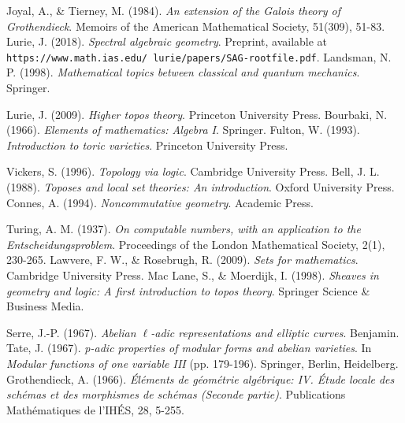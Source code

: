 \documentclass{article}
\begin{document}
\begin{thebibliography}{9}
 Joyal, A., \& Tierney, M. (1984). \textit{An extension of the Galois theory of Grothendieck}. Memoirs of the American Mathematical Society, 51(309), 51-83.
 Lurie, J. (2018). \textit{Spectral algebraic geometry}. Preprint, available at \texttt{https://www.math.ias.edu/~lurie/papers/SAG-rootfile.pdf}.
 Landsman, N. P. (1998). \textit{Mathematical topics between classical and quantum mechanics}. Springer.

 Lurie, J. (2009). \textit{Higher topos theory}. Princeton University Press.
 Bourbaki, N. (1966). \textit{Elements of mathematics: Algebra I}. Springer.
 Fulton, W. (1993). \textit{Introduction to toric varieties}. Princeton University Press.

 Vickers, S. (1996). \textit{Topology via logic}. Cambridge University Press.
 Bell, J. L. (1988). \textit{Toposes and local set theories: An introduction}. Oxford University Press.
 Connes, A. (1994). \textit{Noncommutative geometry}. Academic Press.
  
 Turing, A. M. (1937). \textit{On computable numbers, with an application to the Entscheidungsproblem}. Proceedings of the London Mathematical Society, 2(1), 230-265.
 Lawvere, F. W., \& Rosebrugh, R. (2009). \textit{Sets for mathematics}. Cambridge University Press.
 Mac Lane, S., \& Moerdijk, I. (1998). \textit{Sheaves in geometry and logic: A first introduction to topos theory}. Springer Science \& Business Media.

 Serre, J.-P. (1967). \textit{Abelian \(\ell\)-adic representations and elliptic curves}. Benjamin.
 Tate, J. (1967). \textit{p-adic properties of modular forms and abelian varieties}. In \textit{Modular functions of one variable III} (pp. 179-196). Springer, Berlin, Heidelberg.
 Grothendieck, A. (1966). \textit{Éléments de géométrie algébrique: IV. Étude locale des schémas et des morphismes de schémas (Seconde partie)}. Publications Mathématiques de l'IHÉS, 28, 5-255.

\end{thebibliography}
\end{document}
